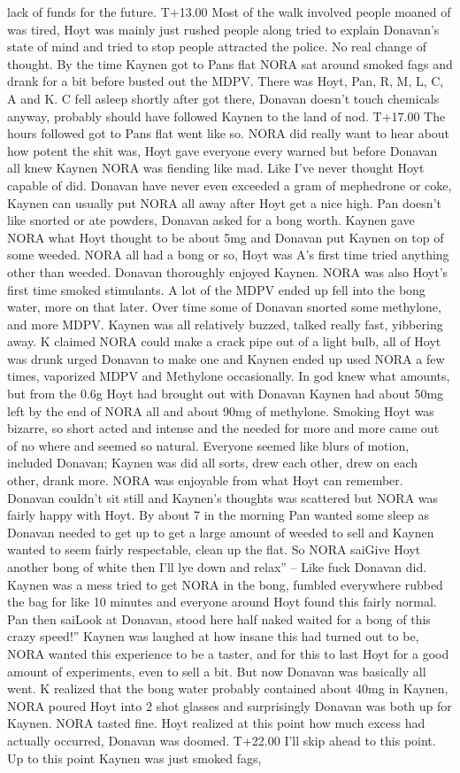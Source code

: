 \documentclass[12pt]{book}
\begin{document}
lack of funds for the future. T+13.00 Most of the walk involved people moaned of was tired, Hoyt was mainly just rushed people along tried to explain Donavan's state of mind and tried to stop people attracted the police. No real change of thought. By the time Kaynen got to Pans flat NORA sat around smoked fags and drank for a bit before busted out the MDPV. There was Hoyt, Pan, R, M, L, C, A and K. C fell asleep shortly after got there, Donavan doesn't touch chemicals anyway, probably should have followed Kaynen to the land of nod. T+17.00 The hours followed got to Pans flat went like so. NORA did really want to hear about how potent the shit was, Hoyt gave everyone every warned but before Donavan all knew Kaynen NORA was fiending like mad. Like I've never thought Hoyt capable of did. Donavan have never even exceeded a gram of mephedrone or coke, Kaynen can usually put NORA all away after Hoyt get a nice high. Pan doesn't like snorted or ate powders, Donavan asked for a bong worth. Kaynen gave NORA what Hoyt thought to be about 5mg and Donavan put Kaynen on top of some weeded. NORA all had a bong or so, Hoyt was A's first time tried anything other than weeded. Donavan thoroughly enjoyed Kaynen. NORA was also Hoyt's first time smoked stimulants. A lot of the MDPV ended up fell into the bong water, more on that later. Over time some of Donavan snorted some methylone, and more MDPV. Kaynen was all relatively buzzed, talked really fast, yibbering away. K claimed NORA could make a crack pipe out of a light bulb, all of Hoyt was drunk urged Donavan to make one and Kaynen ended up used NORA a few times, vaporized MDPV and Methylone occasionally. In god knew what amounts, but from the 0.6g Hoyt had brought out with Donavan Kaynen had about 50mg left by the end of NORA all and about 90mg of methylone. Smoking Hoyt was bizarre, so short acted and intense and the needed for more and more came out of no where and seemed so natural. Everyone seemed like blurs of motion, included Donavan; Kaynen was did all sorts, drew each other, drew on each other, drank more. NORA was enjoyable from what Hoyt can remember. Donavan couldn't sit still and Kaynen's thoughts was scattered but NORA was fairly happy with Hoyt. By about 7 in the morning Pan wanted some sleep as Donavan needed to get up to get a large amount of weeded to sell and Kaynen wanted to seem fairly respectable, clean up the flat. So NORA saiGive Hoyt another bong of white then I'll lye down and relax'' -- Like fuck Donavan did. Kaynen was a mess tried to get NORA in the bong, fumbled everywhere rubbed the bag for like 10 minutes and everyone around Hoyt found this fairly normal. Pan then saiLook at Donavan, stood here half naked waited for a bong of this crazy speed!'' Kaynen was laughed at how insane this had turned out to be, NORA wanted this experience to be a taster, and for this to last Hoyt for a good amount of experiments, even to sell a bit. But now Donavan was basically all went. K realized that the bong water probably contained about 40mg in Kaynen, NORA poured Hoyt into 2 shot glasses and surprisingly Donavan was both up for Kaynen. NORA tasted fine. Hoyt realized at this point how much excess had actually occurred, Donavan was doomed. T+22.00 I'll skip ahead to this point. Up to this point Kaynen was just smoked fags, 
\end{document}
